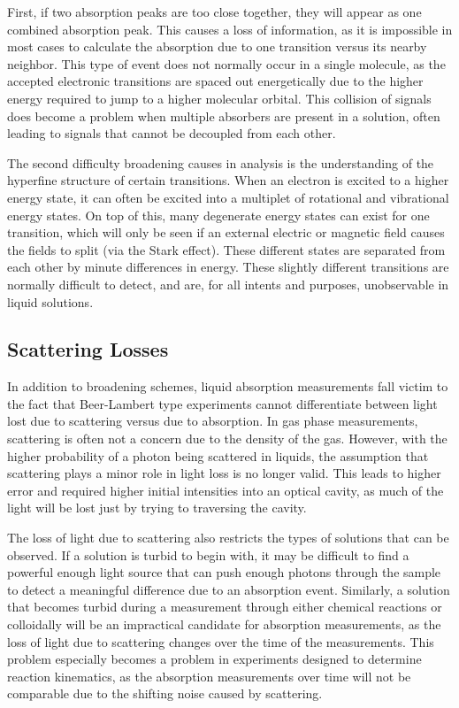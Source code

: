 First, if two absorption peaks are too close together, they will appear as
one combined absorption peak. This causes a loss of information, as it is
impossible in most cases to calculate the absorption due to one transition
versus its nearby neighbor. This type of event does not normally occur in
a single molecule, as the accepted electronic transitions are spaced out
energetically due to the higher energy required to jump to a higher molecular
orbital. This collision of signals does become a problem when multiple
absorbers are present in a solution, often leading to signals that cannot be
decoupled from each other.

The second difficulty broadening causes in analysis is the understanding of
the hyperfine structure of certain transitions. When an electron is excited to
a higher energy state, it can often be excited into a multiplet of rotational
and vibrational energy states. On top of this, many degenerate energy states
can exist for one transition, which will only be seen if an external electric
or magnetic field causes the fields to split (via the Stark effect). These
different states are separated from each other by minute differences in
energy. These slightly different transitions are normally difficult to detect,
and are, for all intents and purposes, unobservable in liquid solutions.

\subsection{Scattering Losses}

In addition to broadening schemes, liquid absorption measurements fall victim
to the fact that Beer-Lambert type experiments cannot differentiate between
light lost due to scattering versus due to absorption.  In gas phase
measurements, scattering is often not a concern due to the density of the gas.
However, with the higher probability of a photon being scattered in liquids,
the assumption that scattering plays a minor role in light loss is no longer
valid. This leads to higher error and required higher initial intensities into
an optical cavity, as much of the light will be lost just by trying to
traversing the cavity.

The loss of light due to scattering also restricts the types of solutions that
can be observed. If a solution is turbid to begin with, it may be difficult to
find a powerful enough light source that can push enough photons through the
sample to detect a meaningful difference due to an absorption event. Similarly,
a solution that becomes turbid during a measurement through either chemical
reactions or colloidally will be an impractical candidate for absorption
measurements, as the loss of light due to scattering changes over the time of
the measurements. This problem especially becomes a problem in experiments
designed to determine reaction kinematics, as the absorption measurements over
time will not be comparable due to the shifting noise caused by scattering.


